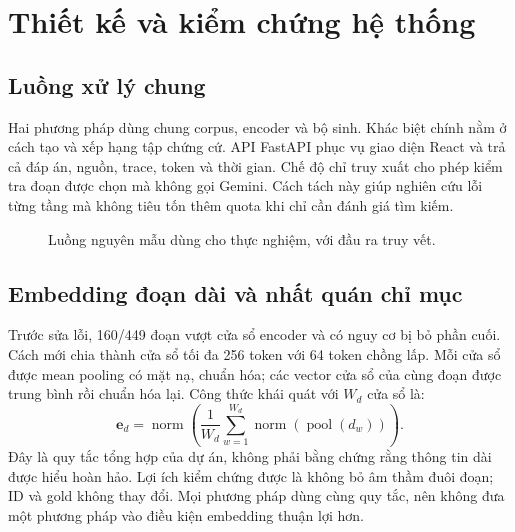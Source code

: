 \section{Thiết kế và kiểm chứng hệ thống}
\subsection{Luồng xử lý chung}
Hai phương pháp dùng chung corpus, encoder và bộ sinh. Khác biệt chính nằm ở cách tạo và xếp hạng tập chứng cứ. API FastAPI phục vụ giao diện React và trả cả đáp án, nguồn, trace, token và thời gian. Chế độ chỉ truy xuất cho phép kiểm tra đoạn được chọn mà không gọi Gemini. Cách tách này giúp nghiên cứu lỗi từng tầng mà không tiêu tốn thêm quota khi chỉ cần đánh giá tìm kiếm.

\begin{figure}[H]
\centering
{}
\caption{Luồng nguyên mẫu dùng cho thực nghiệm, với đầu ra truy vết.}
\end{figure}

\subsection{Embedding đoạn dài và nhất quán chỉ mục}
Trước sửa lỗi, 160/449 đoạn vượt cửa sổ encoder và có nguy cơ bị bỏ phần cuối. Cách mới chia thành cửa sổ tối đa 256 token với 64 token chồng lấp. Mỗi cửa sổ được mean pooling có mặt nạ, chuẩn hóa; các vector cửa sổ của cùng đoạn được trung bình rồi chuẩn hóa lại. Công thức khái quát với $W_d$ cửa sổ là:
\begin{equation}
 \mathbf e_d=\operatorname{norm}\!\left(\frac{1}{W_d}\sum_{w=1}^{W_d}\operatorname{norm}(\operatorname{pool}(d_w))\right).
\end{equation}
Đây là quy tắc tổng hợp của dự án, không phải bằng chứng rằng thông tin dài được hiểu hoàn hảo. Lợi ích kiểm chứng được là không bỏ âm thầm đuôi đoạn; ID và gold không thay đổi. Mọi phương pháp dùng cùng quy tắc, nên không đưa một phương pháp vào điều kiện embedding thuận lợi hơn.

